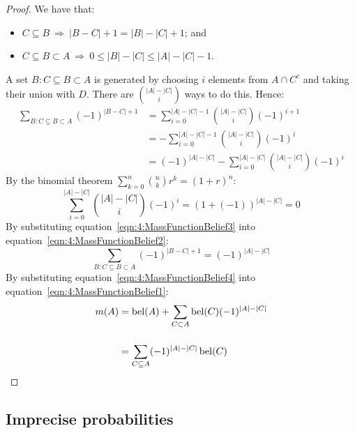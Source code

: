 \begin{thm}
\begin{proof}
    We have that:
    \begin{itemize}
      \item $C \subseteq B \ \Rightarrow\  |B - C| + 1 = |B| - |C| + 1$; and
      \item $C \subseteq B \subset A \ \Rightarrow\  0 \leq |B| - |C| \leq |A| - |C| - 1$.
    \end{itemize}
    A set $B : C \subseteq B \subset A$ is generated by choosing $i$ elements from
    $A \cap C^c$ and taking their union with $D$.
    There are $\binom{|A| - |C|}{i}$ ways to do this.
    Hence:
    \begin{align}
      \label{eqn:4:MassFunctionBelief2}
      \sum_{B : C \subseteq B \subset A} (-1)^{|B - C| + 1}
       & = \sum_{i = 0}^{|A| - |C| - 1} \binom{|A| - |C|}{i} (-1)^{i + 1} \nonumber
      \\[3ex]
       & = - \sum_{i = 0}^{|A| - |C| - 1} \binom{|A| - |C|}{i} (-1)^{i} \nonumber
      \\[3ex]
       & = (- 1)^{|A| - |C|} - \sum_{i = 0}^{|A| - |C|} \binom{|A| - |C|}{i} (-1)^{i}
    \end{align}
    By the binomial theorem $\sum_{k = 0}^{n} \binom{n}{k} r^{k} = (1 + r)^{n}$:
    \begin{equation}
      \label{eqn:4:MassFunctionBelief3}
      \sum_{i = 0}^{|A| - |C|} \binom{|A| - |C|}{i} (-1)^{i}
      = (1 + (- 1))^{|A| - |C|}
      = 0
    \end{equation}
    By substituting equation~\ref{eqn:4:MassFunctionBelief3} into
    equation~\ref{eqn:4:MassFunctionBelief2}:
    \begin{equation}
      \label{eqn:4:MassFunctionBelief4}
      \sum_{B : C \subseteq B \subset A} (-1)^{|B - C| + 1}
      = (- 1)^{|A| - |C|}
    \end{equation}
    By substituting equation~\ref{eqn:4:MassFunctionBelief4} into
    equation~\ref{eqn:4:MassFunctionBelief1}:
    \begin{align*}
      m(A)
       & = \operatorname*{bel}(A) + \sum_{C \subset A} \operatorname*{bel}(C) (- 1)^{|A| - |C|}
      \\[3ex]
       & = \sum_{C \subseteq A}  (- 1)^{|A| - |C|} \operatorname*{bel}(C)
    \end{align*}
  \end{proof}
\end{thm}

\subsection{Imprecise probabilities}

